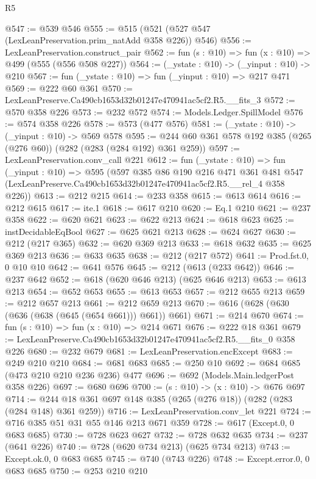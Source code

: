 \begin{lexlean}{R5}
\begin{coremodule}
@547 := @539 @546
@555 := @515 (@521 (@527 @547 (LexLeanPreservation.prim_natAdd @358 @226)) @546)
@556 := LexLeanPreservation.construct_pair
@562 := fun (s : @10) => fun (x : @10) => @499 (@555 (@556 @508 @227))
@564 := (_ystate : @10) -> (_yinput : @10) -> @210
@567 := fun (_ystate : @10) => fun (_yinput : @10) => @217 @471
@569 := @222 @60 @361
@570 := LexLeanPreserve.Ca490cb1653d32b01247e470941ac5cf2.R5.__fits_3
@572 := @570 @358 @226
@573 := @232 @572
@574 := Models.Ledger.SpillModel
@576 := @574 @358 @226
@578 := @573 (@477 @576)
@581 := (_ystate : @10) -> (_yinput : @10) -> @569 @578
@595 := @244 @60 @361 @578 @192 @385 (@265 (@276 @60)) (@282 (@283 (@284 @192) @361 @259))
@597 := LexLeanPreservation.conv_call @221
@612 := fun (_ystate : @10) =>
  fun (_yinput : @10) =>
  @595
    (@597
      @385
      @86
      @190
      @216
      @471
      @361
      @481
      @547
      (LexLeanPreserve.Ca490cb1653d32b01247e470941ac5cf2.R5.__rel_4 @358 @226))
@613 := @212 @215
@614 := @233 @358
@615 := @613 @614
@616 := @212 @615
@617 := ite.{1}
@618 := @617 @210
@620 := Eq.{1} @210
@621 := @237 @358
@622 := @620 @621
@623 := @622 @213
@624 := @618 @623
@625 := instDecidableEqBool
@627 := @625 @621 @213
@628 := @624 @627
@630 := @212 (@217 @365)
@632 := @620 @369 @213
@633 := @618 @632
@635 := @625 @369 @213
@636 := @633 @635
@638 := @212 (@217 @572)
@641 := Prod.fst.{0, 0} @10 @10
@642 := @641 @576
@645 := @212 (@613 (@233 @642))
@646 := @237 @642
@652 := @618 (@620 @646 @213) (@625 @646 @213)
@653 := @613 @213
@654 := @652 @653
@655 := @613 @653
@657 := @212 @655 @213
@659 := @212 @657 @213
@661 := @212 @659 @213
@670 := @616 (@628 (@630 (@636 (@638 (@645 (@654 @661))) @661)) @661)
@671 := @214 @670
@674 := fun (s : @10) => fun (x : @10) => @214 @671
@676 := @222 @18 @361
@679 := LexLeanPreserve.Ca490cb1653d32b01247e470941ac5cf2.R5.__fits_0 @358 @226
@680 := @232 @679
@681 := LexLeanPreservation.encExcept
@683 := @249 @210 @210
@684 := @681 @683
@685 := @250 @10
@692 := @684 @685 (@473 @210 @210 @236 @236) @477
@696 := @692 (Models.Main.ledgerPost @358 @226)
@697 := @680 @696
@700 := (s : @10) -> (x : @10) -> @676 @697
@714 := @244 @18 @361 @697 @148 @385 (@265 (@276 @18)) (@282 (@283 (@284 @148) @361 @259))
@716 := LexLeanPreservation.conv_let @221
@724 := @716 @385 @51 @31 @55 @146 @213 @671 @359
@728 := @617 (Except.{0, 0} @683 @685)
@730 := @728 @623 @627
@732 := @728 @632 @635
@734 := @237 (@641 @226)
@740 := @728 (@620 @734 @213) (@625 @734 @213)
@743 := Except.ok.{0, 0} @683 @685
@745 := @740 (@743 @226)
@748 := Except.error.{0, 0} @683 @685
@750 := @253 @210 @210

\end{coremodule}
\end{lexlean}
